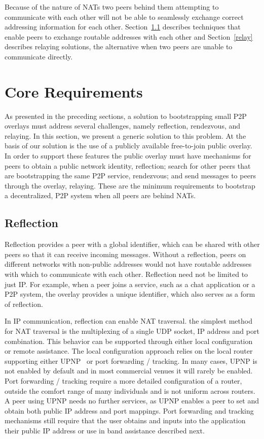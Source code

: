 \documentclass[conference]{IEEEtran}
\begin{document}
Because of the nature of NATs two peers behind them attempting to communicate
with each other will not be able to seamlessly exchange correct addressing
information for each other.  Section~\ref{reflection} describes techniques that
enable peers to exchange routable addresses with each other and
Section~\ref{relay} describes relaying solutions, the alternative when two
peers are unable to communicate directly.

\section{Core Requirements}
\label{overview}

As presented in the preceding sections, a solution to bootstrapping small P2P
overlays must address several challenges, namely reflection, rendezvous, and
relaying.  In this section, we present a generic solution to this problem.  At
the basis of our solution is the use of a publicly available free-to-join
public overlay.  In order to support these features the public overlay must
have mechanisms for peers to obtain a public network identity, reflection;
search for other peers that are bootstrapping the same P2P service, rendezvous;
and send messages to peers through the overlay, relaying.  These are the
minimum requirements to bootstrap a decentralized, P2P system when all peers
are behind NATs.

\subsection{Reflection}
\label{reflection}

Reflection provides a peer with a global identifier, which can be shared with
other peers so that it can receive incoming messages.  Without a reflection,
peers on different networks with non-public addresses would not have routable
addresses with which to communicate with each other.  Reflection need not be
limited to just IP.  For example, when a peer joins a service, such as a chat
application or a P2P system, the overlay provides a unique identifier, which
also serves as a form of reflection.

In IP communication, reflection can enable NAT traversal.  the simplest method
for NAT traversal is the multiplexing of a single UDP socket, IP address and
port combination.  This behavior can be supported through either local
configuration or remote assistance.  The local configuration approach relies on
the local router supporting either UPNP~\cite{upnp} or port forwarding /
tracking.  In many cases, UPNP is not enabled by default and in most commercial
venues it will rarely be enabled.  Port forwarding / tracking require a more
detailed configuration of a router, outside the comfort range of many
individuals and is not uniform across routers.  A peer using UPNP needs no
further services, as UPNP enables a peer to set and obtain both public IP
address and port mappings.  Port forwarding and tracking mechanisms still
require that the user obtains and inputs into the application their public IP
address or use in band assistance described next.
\end{document}
